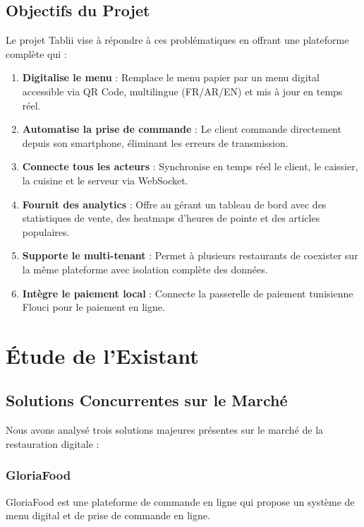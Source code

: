 \documentclass[12pt,a4paper]{report}
\begin{document}
\subsection{Objectifs du Projet}

Le projet Tablii vise à répondre à ces problématiques en offrant une plateforme complète qui :

\begin{enumerate}[leftmargin=1.5cm, itemsep=0.3cm]
    \item \textbf{Digitalise le menu} : Remplace le menu papier par un menu digital accessible via QR Code, multilingue (FR/AR/EN) et mis à jour en temps réel.
    \item \textbf{Automatise la prise de commande} : Le client commande directement depuis son smartphone, éliminant les erreurs de transmission.
    \item \textbf{Connecte tous les acteurs} : Synchronise en temps réel le client, le caissier, la cuisine et le serveur via WebSocket.
    \item \textbf{Fournit des analytics} : Offre au gérant un tableau de bord avec des statistiques de vente, des heatmaps d'heures de pointe et des articles populaires.
    \item \textbf{Supporte le multi-tenant} : Permet à plusieurs restaurants de coexister sur la même plateforme avec isolation complète des données.
    \item \textbf{Intègre le paiement local} : Connecte la passerelle de paiement tunisienne Flouci pour le paiement en ligne.
\end{enumerate}

\section{Étude de l'Existant}

\subsection{Solutions Concurrentes sur le Marché}

Nous avons analysé trois solutions majeures présentes sur le marché de la restauration digitale :

\subsubsection{GloriaFood}

GloriaFood est une plateforme de commande en ligne qui propose un système de menu digital et de prise de commande en ligne.
\end{document}
